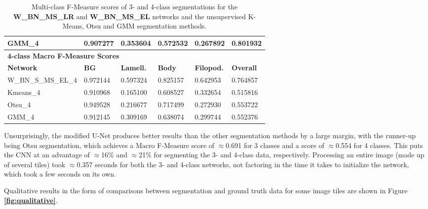 \begin {table}
\begin{flushleft}
\begin {tabular}[!htb]{|l|l|l|l|l|l|}
			GMM\_4& 0.907277& 0.353604& 0.572532& 0.267892& 0.801932 \\ \hline
			\multicolumn{6}{|l|}{\textbf{4-class Macro F-Measure Scores}} \\ \hline
			\textbf{Network}& \textbf{BG}& \textbf{Lamell.}& \textbf{Body}& \textbf{Filopod.}& \textbf{Overall} \\ \hline
			W\_BN\_S\_MS\_EL\_4& \cellcolor{green!25}0.972144& \cellcolor{green!25}0.597324& \cellcolor{green!25}0.825157& \cellcolor{green!25}0.642953& \cellcolor{green!25}0.764857 \\ \hline
			Kmeans\_4& 0.910968& 0.165100& 0.608527& 0.332654& 0.515816 \\ \hline
			Otsu\_4& 0.949528& 0.216677& 0.717499& 0.272930& 0.553722 \\ \hline
			GMM\_4& 0.912145& 0.309169& 0.638074& 0.299744& 0.552376 \\ \hline
		\end {tabular}
	\end {flushleft}
\caption[Multi-class F-Measure scores for final network and other image segmentation methods.]{Multi-class F-Measure scores of 3- and 4-class segmentations for the \textbf{W\_BN\_MS\_LR} and \textbf{W\_BN\_MS\_EL} networks and the unsupervised K-Means, Otsu and GMM segmentation methods.}
\label{tab:resultsfinal}
\end {table}

Unsurprisingly, the modified U-Net produces better results than the other segmentation methods by a large margin, with the runner-up being Otsu segmentation, which achieves a Macro F-Measure score of $\approx$0.691 for 3 classes and a score of $\approx$0.554 for 4 classes. This puts the CNN at an advantage of $\approx$16\% and $\approx$21\% for segmenting the 3- and 4-class data, respectively. Processing an entire image (made up of several tiles) took $\approx$0.357 seconds for both the 3- and 4-class networks, not factoring in the time it takes to initialize the network, which took a few seconds on its own.

Qualitative results in the form of comparisons between segmentation and ground truth data for some image tiles are shown in Figure \textbf{\ref{fig:qualitative}}.


